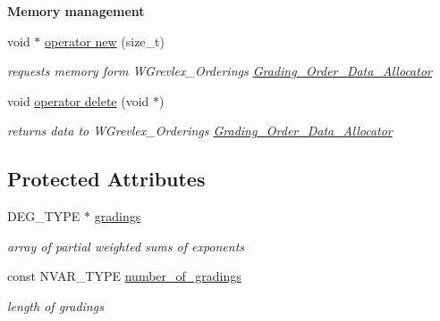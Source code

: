 \begin{Indent}\textbf{ Memory management}\par
\begin{DoxyCompactItemize}
\item 
\mbox{\label{class_w_grevlex___order___data_ac81e3130c94b4f908e277c0c9a6f3d83}} 
void $\ast$ \hyperlink{class_w_grevlex___order___data_ac81e3130c94b4f908e277c0c9a6f3d83}{operator new} (size\+\_\+t)
\begin{DoxyCompactList}\small\item\em requests memory form W\+Grevlex\+\_\+\+Ordering\textquotesingle{}s \hyperlink{class_grading___order___data___allocator}{Grading\+\_\+\+Order\+\_\+\+Data\+\_\+\+Allocator} \end{DoxyCompactList}\item 
\mbox{\label{class_w_grevlex___order___data_aa512b345dc053fe960b5d955d73270c7}} 
void \hyperlink{class_w_grevlex___order___data_aa512b345dc053fe960b5d955d73270c7}{operator delete} (void $\ast$)
\begin{DoxyCompactList}\small\item\em returns data to W\+Grevlex\+\_\+\+Ordering\textquotesingle{}s \hyperlink{class_grading___order___data___allocator}{Grading\+\_\+\+Order\+\_\+\+Data\+\_\+\+Allocator} \end{DoxyCompactList}\end{DoxyCompactItemize}
\end{Indent}
\subsection*{Protected Attributes}
\begin{DoxyCompactItemize}
\item 
\mbox{\label{class_w_grevlex___order___data_a84079d31936d09b373b3cb3d79c5cec4}} 
D\+E\+G\+\_\+\+T\+Y\+PE $\ast$ \hyperlink{class_w_grevlex___order___data_a84079d31936d09b373b3cb3d79c5cec4}{gradings}
\begin{DoxyCompactList}\small\item\em array of partial weighted sums of exponents \end{DoxyCompactList}\item 
\mbox{\label{class_w_grevlex___order___data_a4ec320689813725e8f1e0b23334e6cbd}} 
const N\+V\+A\+R\+\_\+\+T\+Y\+PE \hyperlink{class_w_grevlex___order___data_a4ec320689813725e8f1e0b23334e6cbd}{number\+\_\+of\+\_\+gradings}
\begin{DoxyCompactList}\small\item\em length of {\ttfamily gradings} \end{DoxyCompactList}\end{DoxyCompactItemize}


